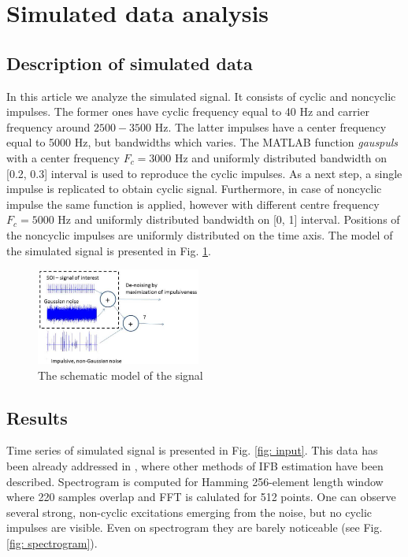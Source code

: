 \documentclass[conference]{IEEEtran}
\begin{document}
\section{Simulated data analysis}
\label{sec:sim data}
\subsection{Description of simulated data}

 In this article we analyze the simulated signal. It  consists of cyclic and noncyclic impulses. The former ones have cyclic frequency equal to 40 Hz and carrier frequency around $2500-3500$ Hz. The latter 
impulses have a center frequency equal to 5000 Hz, but
bandwidths which varies. The  MATLAB
function \emph{gauspuls}  with a center frequency $F_c = 3000$ Hz
and uniformly distributed bandwidth on
[0.2, 0.3] interval is used to reproduce the cyclic impulses. As a next step, a single impulse is replicated to obtain cyclic signal. Furthermore, in case of noncyclic impulse the same function is applied, 
however with different  centre frequency $F_c = 5000$ Hz and uniformly distributed bandwidth on [0, 1] interval. Positions of the noncyclic impulses are uniformly distributed
on the time axis. The model of the simulated signal is presented in Fig. \ref{fig:schemat sygnal}.

\begin{figure}[ht!]
    \centering
    \includegraphics[width = 0.48\textwidth]{figs/schemat.png}
    \caption{The schematic model of the signal}
    \label{fig:schemat sygnal}
\end{figure}

\subsection{Results}

Time series of simulated  signal is presented in Fig. \ref{fig: input}. This data has been already addressed in \cite{wylomanskaimpulsive}, where other methods of IFB estimation have been described. Spectrogram is computed for Hamming 256-element length window where 220 samples overlap and FFT is calulated for 512 points. One can observe several strong, non-cyclic excitations emerging from the noise, but no cyclic impulses are visible. Even on spectrogram they are barely noticeable (see Fig. \ref{fig: spectrogram}).
\end{document}
